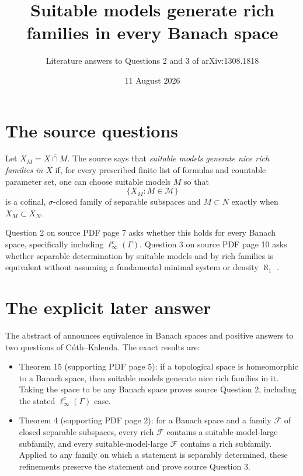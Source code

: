 \documentclass[11pt]{article}
\title{Suitable models generate rich families in every Banach space}
\author{Literature answers to Questions 2 and 3 of arXiv:1308.1818}
\date{11 August 2026}
\begin{document}
\maketitle

\begin{center}
\end{center}

\section*{The source questions}
Let $X_M=\overline{X\cap M}$.  The source says that \emph{suitable models generate nice rich families in $X$} if, for every prescribed finite list of formulas and countable parameter set, one can choose suitable models $M$ so that
\[
 \{X_M:M\in\mathcal M\}
\]
is a cofinal, $\sigma$-closed family of separable subspaces and
$M\subset N$ exactly when $X_M\subset X_N$.

Question 2 on source PDF page 7 asks whether this holds for every Banach space, specifically including $\ell_\infty^c(\Gamma)$. Question 3 on source PDF page 10 asks whether separable determination by suitable models and by rich families is equivalent without assuming a fundamental minimal system or density $\aleph_1$ \cite{CK}.

\section*{The explicit later answer}
The abstract of \cite{Cuth} announces equivalence in Banach spaces and positive answers to two questions of C\'uth--Kalenda.  The exact results are:

\begin{itemize}
\item Theorem 15 (supporting PDF page 5): if a topological space is homeomorphic to a Banach space, then suitable models generate nice rich families in it.  Taking the space to be any Banach space proves source Question 2, including the stated $\ell_\infty^c(\Gamma)$ case.
\item Theorem 4 (supporting PDF page 2): for a Banach space and a family $\mathcal F$ of closed separable subspaces, every rich $\mathcal F$ contains a suitable-model-large subfamily, and every suitable-model-large $\mathcal F$ contains a rich subfamily.  Applied to any family on which a statement is separably determined, these refinements preserve the statement and prove source Question 3.
\end{itemize}
\end{document}
